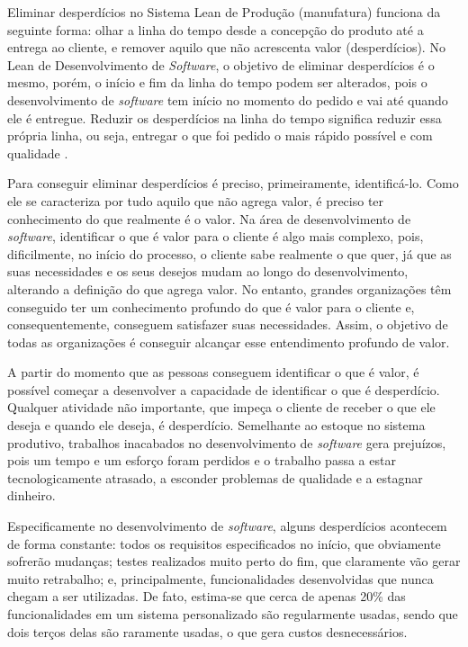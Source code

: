 Eliminar desperdícios no Sistema Lean de Produção (manufatura) funciona da seguinte forma: olhar a linha do tempo desde a concepção do produto até a entrega ao cliente, e remover aquilo que não acrescenta valor (desperdícios). No Lean de Desenvolvimento de \textit{Software}, o objetivo de eliminar desperdícios é o mesmo, porém, o início e fim da linha do tempo podem ser alterados, pois o desenvolvimento de \textit{software} tem início no momento do pedido e vai até quando ele é entregue. Reduzir os desperdícios na linha do tempo significa reduzir essa própria linha, ou seja, entregar o que foi pedido o mais rápido possível e com qualidade  \cite{poppendieck}.

Para conseguir eliminar desperdícios é preciso, primeiramente, identificá-lo. Como ele se caracteriza por tudo aquilo que não agrega valor, é preciso ter conhecimento do que realmente é o valor. Na área de desenvolvimento de \textit{software}, identificar o que é valor para o cliente é algo mais complexo, pois, dificilmente, no início do processo, o cliente sabe realmente o que quer, já que as suas necessidades e os seus desejos mudam ao longo do desenvolvimento, alterando a definição do que agrega valor. No entanto, grandes organizações têm conseguido ter um conhecimento profundo do que é valor para o cliente e, consequentemente, conseguem satisfazer suas necessidades. Assim, o objetivo de todas as organizações é conseguir alcançar esse entendimento profundo de valor.

A partir do momento que as pessoas conseguem identificar o que é valor, é possível começar a desenvolver a capacidade de identificar o que é desperdício. Qualquer atividade não importante, que impeça o cliente de receber o que ele deseja e quando ele deseja, é desperdício. Semelhante ao estoque no sistema produtivo, trabalhos inacabados no desenvolvimento de \textit{software} gera prejuízos, pois um tempo e um esforço foram perdidos e o trabalho passa a estar tecnologicamente atrasado, a esconder problemas de qualidade e a estagnar dinheiro.

Especificamente no desenvolvimento de \textit{software}, alguns desperdícios acontecem de forma constante: todos os requisitos especificados no início, que obviamente sofrerão mudanças; testes realizados muito perto do fim, que claramente vão gerar muito retrabalho; e, principalmente, funcionalidades desenvolvidas que nunca chegam a ser utilizadas.  De fato, estima-se que cerca de apenas 20\% das funcionalidades em um sistema personalizado são regularmente usadas, sendo que dois terços delas são raramente usadas, o que gera custos desnecessários. 

